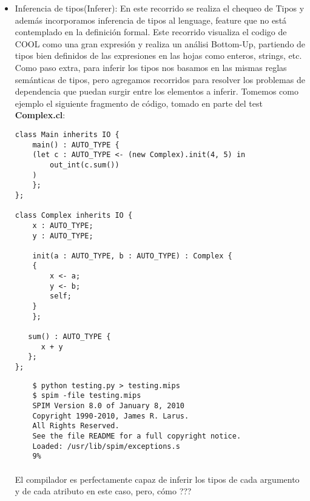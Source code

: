 \documentclass[a4paper, 12pt]{article}
\begin{document}
\begin{itemize}
\begin{itemize}
	\item Inferencia de tipos(Inferer): En este recorrido se realiza el chequeo de Tipos y
	adem\'as incorporamos inferencia de tipos al lenguage, feature que no est\'a contemplado
	en la definici\'on formal. Este recorrido visualiza el codigo de COOL como una gran expresi\'on
	y realiza un an\'alisi Bottom-Up, partiendo de tipos bien definidos de las expresiones en las hojas
	como enteros, strings, etc. Como paso extra, para inferir los tipos nos basamos en las mismas reglas
	sem\'anticas de tipos, pero agregamos recorridos para resolver los problemas de dependencia que puedan surgir
	entre los elementos a inferir. Tomemos como ejemplo el siguiente fragmento de c\'odigo, tomado en parte del
	test \textbf{Complex.cl}:

	\begin{verbatim}
class Main inherits IO {
    main() : AUTO_TYPE {
	(let c : AUTO_TYPE <- (new Complex).init(4, 5) in
	    out_int(c.sum())
	)
    };
};

class Complex inherits IO {
    x : AUTO_TYPE;
    y : AUTO_TYPE;

    init(a : AUTO_TYPE, b : AUTO_TYPE) : Complex {
	{
	    x <- a;
	    y <- b;
	    self;
	}
    };

   sum() : AUTO_TYPE {
      x + y
   };
};
	\end{verbatim}

\begin{verbatim}
	$ python testing.py > testing.mips
	$ spim -file testing.mips
	SPIM Version 8.0 of January 8, 2010
	Copyright 1990-2010, James R. Larus.
	All Rights Reserved.
	See the file README for a full copyright notice.
	Loaded: /usr/lib/spim/exceptions.s
	9%             
\end{verbatim}
\paragraph{}
El compilador es perfectamente capaz de inferir los tipos de cada argumento y de cada
atributo en este caso, pero, c\'omo ???

\end{itemize}
\end{itemize}
\end{document}
